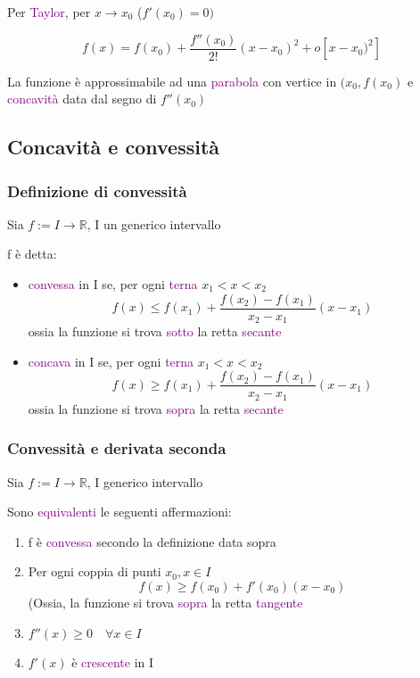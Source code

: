 \documentclass{article}
\begin{document}
Per \textcolor{purple}{Taylor}, per $x \to x_0$ ($f'(x_0)=0)$

\[f(x)= f(x_0) + \frac{f''(x_0)}{2!}(x-x_0)^2 + o[x-x_0)^2]\]

La funzione è approssimabile ad una \textcolor{purple}{parabola} con vertice in $(x_0, f(x_0)$ e \textcolor{purple}{concavità} data dal segno di $f''(x_0)$

\subsection{Concavità e convessità}

\subsubsection{Definizione di convessità}

Sia $f:= I \to \mathbb{R}$, I un generico intervallo
\begin{tcolorbox}[colback = pink!10!white,   colframe=red!50!blue]

    f è detta: 

    \begin{itemize}
        \item \textcolor{purple}{convessa} in I se, per ogni \textcolor{purple}{terna} $x_1 < x< x_2$
        \[f(x) \le f(x_1) + \frac{f(x_2) - f(x_1)}{x_2 - x_1}(x -x_1)\]
        ossia la funzione si trova \textcolor{purple}{sotto} la retta \textcolor{purple}{secante}
        \item \textcolor{purple}{concava} in I se, per ogni \textcolor{purple}{terna} $x_1 < x< x_2$
        \[f(x) \ge f(x_1) + \frac{f(x_2) - f(x_1)}{x_2 - x_1}(x -x_1)\]
        ossia la funzione si trova \textcolor{purple}{sopra} la retta \textcolor{purple}{secante}
    \end{itemize}
  
\end{tcolorbox}

\subsubsection{Convessità e derivata seconda}

Sia $f:= I \to \mathbb{R}$, I generico intervallo

Sono \textcolor{purple}{equivalenti} le seguenti affermazioni: 

\begin{enumerate}[label=(\alph*)]
    \item f è \textcolor{purple}{convessa} secondo la definizione data sopra 
    \item Per ogni coppia di punti $x_0, x \in I$
    \[f(x) \ge  f(x_0) + f'(x_0)(x - x_0)\]
    (Ossia, la funzione si trova \textcolor{purple}{sopra} la retta \textcolor{purple}{tangente}
    \item $f''(x) \ge 0 \quad \forall x \in I$
    \item  $f'(x)$ è \textcolor{purple}{crescente} in I  
\end{enumerate}
\end{document}
